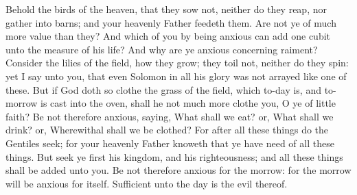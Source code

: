 Behold the birds of the heaven, that they sow not, neither do they reap, nor gather into barns; and your heavenly Father feedeth them. Are not ye of much more value than they? And which of you by being anxious can add one cubit unto the measure of his life? And why are ye anxious concerning raiment? Consider the lilies of the field, how they grow; they toil not, neither do they spin: yet I say unto you, that even Solomon in all his glory was not arrayed like one of these. But if God doth so clothe the grass of the field, which to-day is, and to-morrow is cast into the oven, shall he not much more clothe you, O ye of little faith? Be not therefore anxious, saying, What shall we eat? or, What shall we drink? or, Wherewithal shall we be clothed? For after all these things do the Gentiles seek; for your heavenly Father knoweth that ye have need of all these things. But seek ye first his kingdom, and his righteousness; and all these things shall be added unto you. Be not therefore anxious for the morrow: for the morrow will be anxious for itself. Sufficient unto the day is the evil thereof. 

